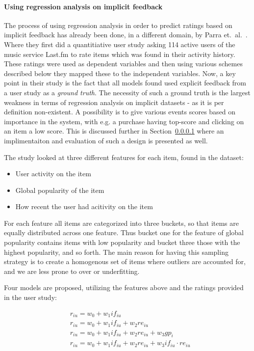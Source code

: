 \paragraph{Using regression analysis on implicit feedback}
The process of using regression analysis in order to predict ratings based on
implicit feedback has already been done, in a different domain, by Parra et.\
al.~\cite{parra2011walk}. Where they first did a quantitiative user study
asking 114 active users of the music service Last.fm to rate items which was
found in their activity history. These ratings were used as dependent variables
and then using various schemes described below they mapped these to the
independent variables. Now, a key point in their study is the fact that all
models found used explicit feedback from a user study as a \textit{ground
truth}. The necessity of such a ground truth is the largest weakness in terms
of regression analysis on implicit datasets - as it is per definition
non-existent. A possibility is to give various events scores based on
importance in the system, with e.g. a purchase having top-score and clicking on
an item a low score. This is discussed further in Section~\ref{} where an
implimentaiton and evaluation of such a design is presented as well.

The study looked at three different features for each item, found in the
dataset:

\begin{itemize}
  \item User activity on the item
  \item Global popularity of the item
  \item How recent the user had acitivity on the item
\end{itemize}

For each feature all items are categorized into three buckets, so that items
are equally distributed across one feature. Thus bucket one for the feature of
global popularity contains items with low popularity and bucket three those
with the highest popularity, and so forth. The main reason for having this
sampling strategy is to create a homogenous set of items where outliers are
accounted for, and we are less prone to over or underfitting.

Four models are proposed, utilizing the features above and the ratings provided
in the user study:

\begin{equation}
  \begin{aligned}
    & r_{iu} = w_0 + w_1 if_{iu} \\
    & r_{iu} = w_0 + w_1 if_{iu} + w_2 re_{iu} \\
    & r_{iu} = w_0 + w_1 if_{iu} + w_2 re_{iu} + w_3 gp_{i} \\
    & r_{iu} = w_0 + w_1 if_{iu} + w_2 re_{iu} + w_3 if_{iu} \cdot re_{iu}
  \end{aligned}
\end{equation}

